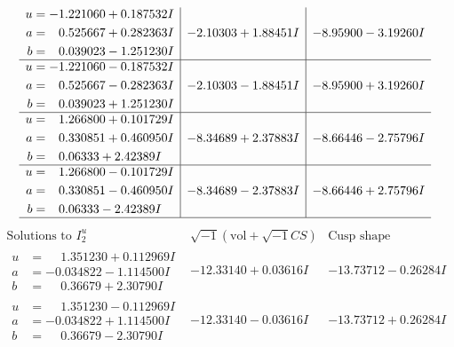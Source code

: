 \documentclass[1p]{elsarticle_modified}
\theoremstyle{definition}
\newcommand{\I}{\sqrt{-1}}
\begin{document}
$$\begin{array}{c|c|c}
\begin{aligned}
u &= -1.221060 + 0.187532 I \\
a &= \phantom{-}0.525667 + 0.282363 I \\
b &= \phantom{-}0.039023 - 1.251230 I\end{aligned}
 & -2.10303 + 1.88451 I & -8.95900 - 3.19260 I \\ \hline\begin{aligned}
u &= -1.221060 - 0.187532 I \\
a &= \phantom{-}0.525667 - 0.282363 I \\
b &= \phantom{-}0.039023 + 1.251230 I\end{aligned}
 & -2.10303 - 1.88451 I & -8.95900 + 3.19260 I \\ \hline\begin{aligned}
u &= \phantom{-}1.266800 + 0.101729 I \\
a &= \phantom{-}0.330851 + 0.460950 I \\
b &= \phantom{-}0.06333 + 2.42389 I\end{aligned}
 & -8.34689 + 2.37883 I & -8.66446 - 2.75796 I \\ \hline\begin{aligned}
u &= \phantom{-}1.266800 - 0.101729 I \\
a &= \phantom{-}0.330851 - 0.460950 I \\
b &= \phantom{-}0.06333 - 2.42389 I\end{aligned}
 & -8.34689 - 2.37883 I & -8.66446 + 2.75796 I\\
 \hline 
 \end{array}$$\newpage$$\begin{array}{c|c|c}  
\text{Solutions to }I^u_{2}& \I (\text{vol} + \sqrt{-1}CS) & \text{Cusp shape}\\
 \hline 
\begin{aligned}
u &= \phantom{-}1.351230 + 0.112969 I \\
a &= -0.034822 - 1.114500 I \\
b &= \phantom{-}0.36679 + 2.30790 I\end{aligned}
 & -12.33140 + 0.03616 I & -13.73712 - 0.26284 I \\ \hline\begin{aligned}
u &= \phantom{-}1.351230 - 0.112969 I \\
a &= -0.034822 + 1.114500 I \\
b &= \phantom{-}0.36679 - 2.30790 I\end{aligned}
 & -12.33140 - 0.03616 I & -13.73712 + 0.26284 I \\ \hline\begin{aligned}

\end{aligned}
\end{array}$$
\end{document}

